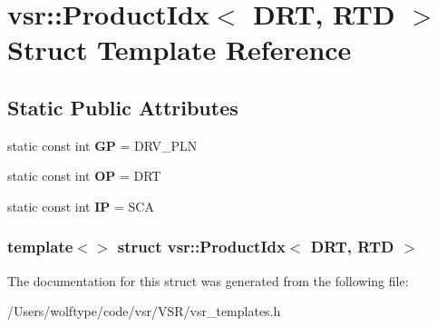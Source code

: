 \hypertarget{structvsr_1_1_product_idx_3_01_d_r_t_00_01_r_t_d_01_4}{\section{vsr\-:\-:Product\-Idx$<$ D\-R\-T, R\-T\-D $>$ Struct Template Reference}
\label{structvsr_1_1_product_idx_3_01_d_r_t_00_01_r_t_d_01_4}
}
\subsection*{Static Public Attributes}
\begin{DoxyCompactItemize}
\item 
\hypertarget{structvsr_1_1_product_idx_3_01_d_r_t_00_01_r_t_d_01_4_a0febe6123ec67960afc6fd3adfaa3dde}{static const int {\bfseries G\-P} = D\-R\-V\-\_\-\-P\-L\-N}\label{structvsr_1_1_product_idx_3_01_d_r_t_00_01_r_t_d_01_4_a0febe6123ec67960afc6fd3adfaa3dde}

\item 
\hypertarget{structvsr_1_1_product_idx_3_01_d_r_t_00_01_r_t_d_01_4_a1375d4db8eb7f44a028564c3e81b6364}{static const int {\bfseries O\-P} = D\-R\-T}\label{structvsr_1_1_product_idx_3_01_d_r_t_00_01_r_t_d_01_4_a1375d4db8eb7f44a028564c3e81b6364}

\item 
\hypertarget{structvsr_1_1_product_idx_3_01_d_r_t_00_01_r_t_d_01_4_a9ed195e2c3f4cbf967a4f499574b18f3}{static const int {\bfseries I\-P} = S\-C\-A}\label{structvsr_1_1_product_idx_3_01_d_r_t_00_01_r_t_d_01_4_a9ed195e2c3f4cbf967a4f499574b18f3}

\end{DoxyCompactItemize}
\subsubsection*{template$<$$>$ struct vsr\-::\-Product\-Idx$<$ D\-R\-T, R\-T\-D $>$}



The documentation for this struct was generated from the following file\-:\begin{DoxyCompactItemize}
\item 
/\-Users/wolftype/code/vsr/\-V\-S\-R/vsr\-\_\-templates.\-h\end{DoxyCompactItemize}
